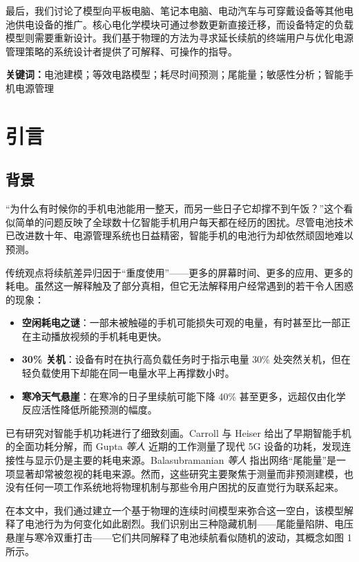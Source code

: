 \documentclass[11pt,a4paper]{ctexart}
\begin{document}
最后，我们讨论了模型向平板电脑、笔记本电脑、电动汽车与可穿戴设备等其他电池供电设备的推广。核心电化学模块可通过参数更新直接迁移，而设备特定的负载模型则需要重新设计。我们基于物理的方法为寻求延长续航的终端用户与优化电源管理策略的系统设计者提供了可解释、可操作的指导。

\noindent\textbf{关键词：}电池建模；等效电路模型；耗尽时间预测；尾能量；敏感性分析；智能手机电源管理

\newpage

\section{引言}

\subsection{背景}

“为什么有时候你的手机电池能用一整天，而另一些日子它却撑不到午饭？”这个看似简单的问题反映了全球数十亿智能手机用户每天都在经历的困扰。尽管电池技术已改进数十年、电源管理系统也日益精密，智能手机的电池行为却依然顽固地难以预测。

传统观点将续航差异归因于“重度使用”——更多的屏幕时间、更多的应用、更多的耗电。虽然这一解释触及了部分真相，但它无法解释用户经常遇到的若干令人困惑的现象：

\begin{itemize}[leftmargin=2em]
\item \textbf{空闲耗电之谜}：一部未被触碰的手机可能损失可观的电量，有时甚至比一部正在主动播放视频的手机耗电更快。
\item \textbf{30\% 关机}：设备有时在执行高负载任务时于指示电量 30\% 处突然关机，但在轻负载使用下却能在同一电量水平上再撑数小时。
\item \textbf{寒冷天气悬崖}：在寒冷的日子里续航可能下降 40\% 甚至更多，远超仅由化学反应活性降低所能预测的幅度。
\end{itemize}

已有研究对智能手机功耗进行了细致刻画。Carroll 与 Heiser \cite{ref1} 给出了早期智能手机的全面功耗分解，而 Gupta \textit{等人} \cite{ref2} 近期的工作测量了现代 5G 设备的功耗，发现连接性与显示仍是主要的耗电来源。Balasubramanian \textit{等人} \cite{ref3} 指出网络“尾能量”是一项显著却常被忽视的耗电来源。然而，这些研究主要聚焦于测量而非预测建模，也没有任何一项工作系统地将物理机制与那些令用户困扰的反直觉行为联系起来。

在本文中，我们通过建立一个基于物理的连续时间模型来弥合这一空白，该模型解释了电池行为为何变化如此剧烈。我们识别出三种隐藏机制——尾能量陷阱、电压悬崖与寒冷双重打击——它们共同解释了电池续航看似随机的波动，其概念如图 1 所示。
\end{document}

